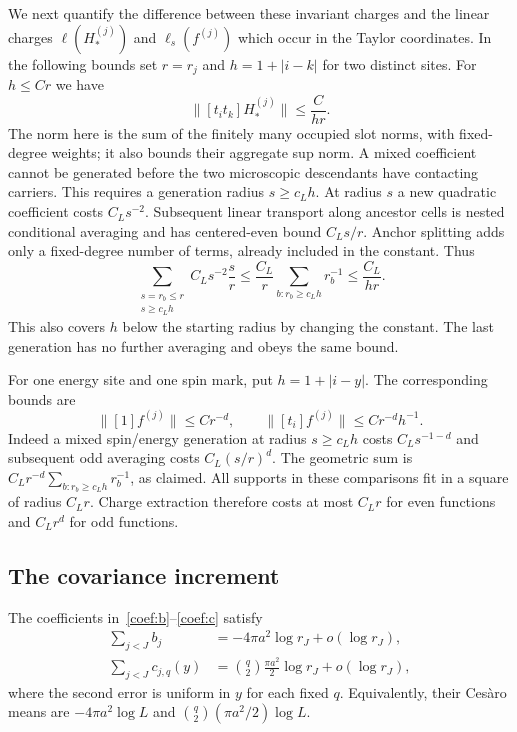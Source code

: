 We next quantify the difference between these invariant charges and the
linear charges $\ell(H_*^{(j)})$ and $\ell_s(f^{(j)})$ which occur in the
Taylor coordinates.  In the following bounds set $r=r_j$ and
$h=1+|i-k|$ for two distinct sites.  For $h\le Cr$ we have
\begin{equation}\label{coef:mixed-column}
 \|[t_it_k]H_*^{(j)}\|\le \frac{C}{hr}.
\end{equation}
The norm here is the sum of the finitely many occupied slot norms, with
fixed-degree weights; it also bounds their aggregate sup norm.  A mixed
coefficient cannot be generated before the two microscopic descendants have
contacting carriers.  This requires a generation radius $s\ge c_Lh$.
At radius $s$ a new quadratic coefficient costs $C_Ls^{-2}$.
Subsequent linear transport along ancestor cells is nested conditional
averaging and has centered-even bound $C_Ls/r$.  Anchor splitting adds only
a fixed-degree number of terms, already included in the constant.  Thus
\[
 \sum_{\substack{s=r_b\le r\\s\ge c_Lh}}
       C_Ls^{-2}\frac{s}{r}
 \le \frac{C_L}{r}\sum_{b:r_b\ge c_Lh}r_b^{-1}
 \le \frac{C_L}{hr}.
\]
This also covers $h$ below the starting radius by changing the constant.
The last generation has no further averaging and obeys the same bound.

For one energy site and one spin mark, put $h=1+|i-y|$.  The corresponding
bounds are
\begin{equation}\label{coef:marked-columns}
 \|[1]f^{(j)}\|\le Cr^{-d},\qquad
 \|[t_i]f^{(j)}\|\le Cr^{-d}h^{-1}.
\end{equation}
Indeed a mixed spin/energy generation at radius $s\ge c_Lh$ costs
$C_Ls^{-1-d}$ and subsequent odd averaging costs $C_L(s/r)^d$.
The geometric sum is $C_Lr^{-d}\sum_{b:r_b\ge c_Lh}r_b^{-1}$, as claimed.
All supports in these comparisons fit in a square of radius $C_Lr$.
Charge extraction therefore costs at most $C_Lr$ for even functions and
$C_Lr^d$ for odd functions.

\subsection{The covariance increment}
\begin{proposition}\label{coef:averages}
The coefficients in~\eqref{coef:b}--\eqref{coef:c} satisfy
\begin{align}
 \sum_{j<J}b_j&=-4\pi a^2\log r_J+o(\log r_J),\label{coef:bsum}\\
 \sum_{j<J}c_{j,q}(y)&=\binom q2\frac{\pi a^2}{2}\log r_J
                         +o(\log r_J),\label{coef:csum}
\end{align}
where the second error is uniform in $y$ for each fixed $q$.  Equivalently,
their Ces\`aro means are $-4\pi a^2\log L$ and
$\binom q2(\pi a^2/2)\log L$.
\end{proposition}


